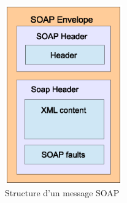 \begin{figure}[h]
    \centering
    \includegraphics[width=0.45\textwidth]{figs/soap_structure.eps}
    \caption{Structure d'un message \textsc{SOAP}}
    \label{fig:soap-message-structure}
\end{figure}

